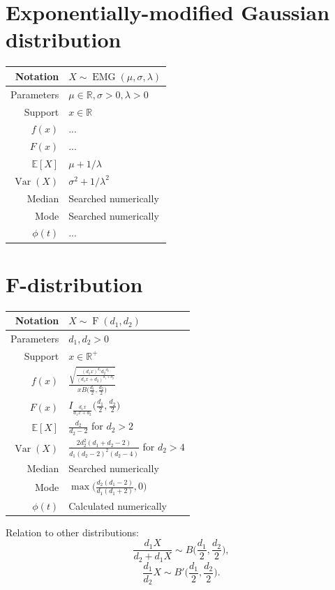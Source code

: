 \documentclass[a4paper,11pt]{article}
\theoremstyle{plain}
\theoremstyle{definition}
\newcommand{\ME}{\mathbb{E}}
\newcommand{\MR}{\mathbb{R}}
\newcommand{\Var}{\operatorname{Var}}
\begin{document}
	\pagebreak
	\section{Exponentially-modified Gaussian distribution}
	\begin{center}
		\begin{tabular}{| r | l |}
			\hline
			Notation & $X \sim \operatorname{EMG}(\mu, \sigma, \lambda)$ \\
			\hline
			Parameters & $\mu \in \MR, \sigma > 0, \lambda > 0$ \\
			\hline
			Support & $x \in \MR$  \\
			\hline
			$f(x)$ & $...  $ \\
			\hline
			$F(x)$ & $... $\\
			\hline
			$\ME[X]$ & $ \mu + 1 / \lambda$ \\
			\hline
			$\Var(X)$ & $\sigma^2 + 1/\lambda^2$ \\
			\hline
			Median & Searched numerically \\
			\hline
			Mode & Searched numerically \\
			\hline
			$\phi(t)$ & $ ... $ \\
			\hline
		\end{tabular}
	\end{center}
	
	
	\pagebreak
	\section{F-distribution}
		\begin{center}
			\begin{tabular}{| r | l |}
				\hline
				Notation & $X \sim \operatorname{F}(d_1, d_2)$ \\
				\hline
				Parameters & $d_1, d_2 > 0$ \\
				\hline
				Support & $x \in \MR^+$  \\
				\hline
				$f(x)$ & $\frac{\sqrt{\frac{(d_1 x)^{d_1} {d_2}^{d_2} }{(d_1x+d_2)^{d_1+d_2}}}}{x B\Big(\frac{d_1}{2},\frac{d_2}{2}\Big)}  $ \\
				\hline
				$F(x)$ & $ I_{\frac{d_1x}{d_1x+d_2}}\Big(\frac{d_1}{2},\frac{d_2}{2}\Big) $\\
				\hline
				$\ME[X]$ & $ \frac{d_2}{d_2-2}$ for $ d_2 > 2 $ \\
				\hline
				$\Var(X)$ & $\frac{2d_2^2(d_1+d_2-2)}{d_1(d_2-2)^2(d_2-4)}$ for $d_2 > 4$ \\
				\hline
				Median & Searched numerically \\
				\hline
				Mode & $\max\Big(\frac{d_2(d_1-2)}{d_1(d_1+2)}, 0\Big)$ \\
				\hline
				$\phi(t)$ & Calculated numerically \\
				\hline
			\end{tabular}
		\end{center}
		Relation to other distributions:
		\[
		\frac{d_1X}{d_2 + d_1X} \sim B\bigg(\frac{d_1}{2}, \frac{d_2}{2} \bigg),
		\]
		\[
		\frac{d_1}{d_2}X \sim B'\bigg(\frac{d_1}{2}, \frac{d_2}{2} \bigg).
		\]
		
\end{document}
